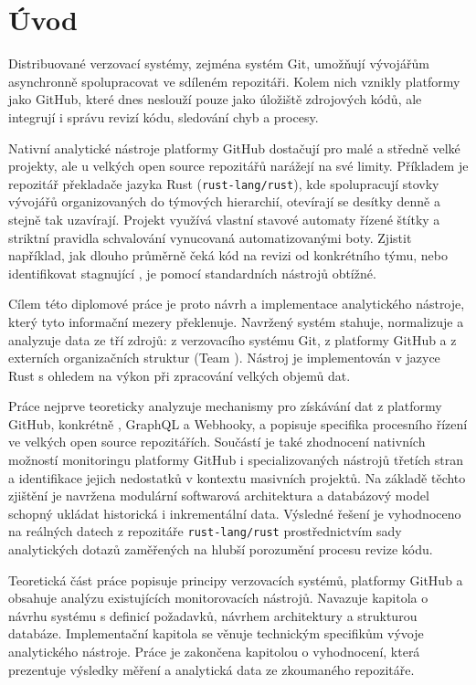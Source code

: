 \chapter{Úvod}
\label{chap:introduction}

Distribuované verzovací systémy, zejména systém Git, umožňují vývojářům asynchronně spolupracovat ve sdíleném repozitáři. Kolem nich vznikly platformy jako GitHub, které dnes neslouží pouze jako úložiště zdrojových kódů, ale integrují i správu revizí kódu, sledování chyb a \CICD procesy.

Nativní analytické nástroje platformy GitHub dostačují pro malé a středně velké projekty, ale u velkých open source repozitářů narážejí na své limity. Příkladem je repozitář překladače jazyka Rust (\texttt{rust-lang/rust}), kde spolupracují stovky vývojářů organizovaných do týmových hierarchií, otevírají se desítky \PR denně a stejně tak uzavírají.  Projekt využívá vlastní stavové automaty řízené štítky a striktní pravidla schvalování vynucovaná automatizovanými boty. Zjistit například, jak dlouho průměrně čeká kód na revizi od konkrétního týmu, nebo identifikovat stagnující \PR, je pomocí standardních nástrojů obtížné.

Cílem této diplomové práce je proto návrh a implementace analytického nástroje, který tyto informační mezery překlenuje. Navržený systém stahuje, normalizuje a analyzuje data ze tří zdrojů: z verzovacího systému Git, z \API platformy GitHub a z externích organizačních struktur (Team \API). Nástroj je implementován v jazyce Rust s ohledem na výkon při zpracování velkých objemů dat.

Práce nejprve teoreticky analyzuje mechanismy pro získávání dat z platformy GitHub, konkrétně \REST \API, GraphQL \API a Webhooky, a popisuje specifika procesního řízení ve velkých open source repozitářích. Součástí je také zhodnocení nativních možností monitoringu platformy GitHub i specializovaných nástrojů třetích stran a identifikace jejich nedostatků v kontextu masivních projektů. Na základě těchto zjištění je navržena modulární softwarová architektura a databázový model schopný ukládat historická i inkrementální data. Výsledné řešení je vyhodnoceno na reálných datech z repozitáře \texttt{rust-lang/rust} prostřednictvím sady analytických dotazů zaměřených na hlubší porozumění procesu revize kódu.

Teoretická část práce popisuje principy verzovacích systémů, \API platformy GitHub a obsahuje analýzu existujících monitorovacích nástrojů. Navazuje kapitola o návrhu systému s definicí požadavků, návrhem architektury a strukturou databáze. Implementační kapitola se věnuje technickým specifikům vývoje analytického nástroje. Práce je zakončena kapitolou o vyhodnocení, která prezentuje výsledky měření a analytická data ze zkoumaného repozitáře.